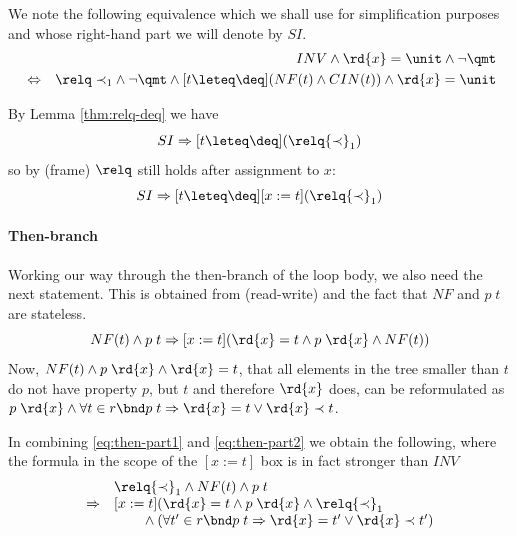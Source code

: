 We note the following equivalence which we shall use for simplification purposes
and whose right-hand part we will denote by $SI$.
\begin{eqnarray}
\label{eq:inv-equiv}
&& INV \land \rd{x} = \unit \land \lnot \qmt \\
&\Leftrightarrow& {\relq \prec_1} \land \lnot \qmt \land [t \leteq \deq](NF(t) \land CIN(t)) \land \rd{x} = \unit 
\nonumber
\end{eqnarray}

By Lemma \ref{thm:relq-deq} we have
\[
SI \Rightarrow [t \leteq \deq](\relq {\prec}_1)
\]
so by (frame) $\relq$ still holds after assignment to $x$:
\begin{equation}
\label{eq:then-part1}
SI \Rightarrow [t \leteq \deq][x := t](\relq {\prec}_1)
\end{equation}

\paragraph{Then-branch} 
Working our way through the
then-branch of the loop body, we also need the next statement. This is
obtained from (read-write) and the fact that $NF$ and $p\; t$ are stateless.
\begin{equation}
\label{eq:then-part2}
NF(t) \land p\;t \Rightarrow [x := t](\rd{x} = t \land p\;\rd{x} \land NF(t))
\end{equation}
Now, $NF(t) \land p\;\rd{x} \land \rd{x} = t$, \IE that all elements in the tree smaller
than $t$ do not have property $p$, but $t$ and therefore $\rd{x}$ does, can be
reformulated as $p\;\rd{x} \land \forall t\in r\bnd p\;t \Rightarrow \rd{x} = t \lor \rd{x} \prec t$. 


In combining
\eqref{eq:then-part1} and \eqref{eq:then-part2} we obtain the following, where
the formula in the scope of the  $[x := t]$ box is in fact stronger than $INV$
\begin{equation}
\label{eq:prem-then}
\begin{array}{l@{\quad}l}
& \relq {\prec}_1 \land NF(t) \land p\;t \\
 \Rightarrow& 
   [x := t](\rd{x} = t \land p\;\rd{x} \land \relq {\prec}_1\\
&\qquad {} \land (\forall t'\in r\bnd p\;t\Rightarrow\rd{x} = t' \lor \rd{x} \prec t')
\end{array}
\end{equation}

